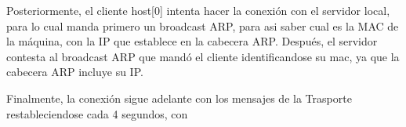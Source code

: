 Posteriormente, el cliente host[0] intenta hacer la conexión con el servidor local, para lo cual manda primero un broadcast ARP, para asi saber 
cual es la MAC de la máquina, con la IP que establece en la cabecera ARP. Después, el servidor contesta al broadcast ARP que mandó el cliente identificandose
su mac, ya que la cabecera ARP incluye su IP.

Finalmente, la conexión sigue adelante con los mensajes de la Trasporte restableciendose cada 4 segundos, con



